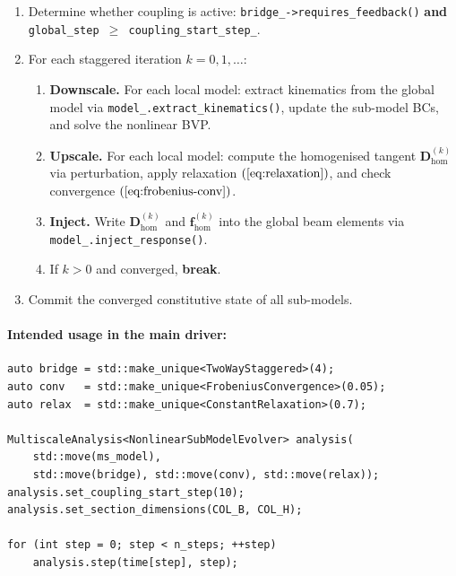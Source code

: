 \begin{enumerate}
  \item Determine whether coupling is active:
    \texttt{bridge\_->requires\_feedback()} \textbf{and}
    \texttt{global\_step $\geq$ coupling\_start\_step\_}.
  \item For each staggered iteration $k = 0, 1, \ldots$:
    \begin{enumerate}[label=(\alph*)]
      \item \textbf{Downscale.}  For each local model:
        extract kinematics from the global model via
        \texttt{model\_.extract\_kinematics()}, update the sub-model
        BCs, and solve the nonlinear BVP.
      \item \textbf{Upscale.}  For each local model:
        compute the homogenised tangent
        $\mathbf{D}_{\mathrm{hom}}^{(k)}$ via perturbation,
        apply relaxation $(\ref{eq:relaxation})$, and check
        convergence $(\ref{eq:frobenius-conv})$.
      \item \textbf{Inject.}  Write
        $\mathbf{D}_{\mathrm{hom}}^{(k)}$ and
        $\mathbf{f}_{\mathrm{hom}}^{(k)}$ into the global beam
        elements via
        \texttt{model\_.inject\_response()}.
      \item If $k > 0$ and converged, \textbf{break}.
    \end{enumerate}
  \item Commit the converged constitutive state of all sub-models.
\end{enumerate}

\paragraph{Intended usage in the main driver:}
\begin{lstlisting}[caption={Proposed refactored main driver.},
                   label={lst:proposed-main}]
auto bridge = std::make_unique<TwoWayStaggered>(4);
auto conv   = std::make_unique<FrobeniusConvergence>(0.05);
auto relax  = std::make_unique<ConstantRelaxation>(0.7);

MultiscaleAnalysis<NonlinearSubModelEvolver> analysis(
    std::move(ms_model),
    std::move(bridge), std::move(conv), std::move(relax));
analysis.set_coupling_start_step(10);
analysis.set_section_dimensions(COL_B, COL_H);

for (int step = 0; step < n_steps; ++step)
    analysis.step(time[step], step);
\end{lstlisting}

